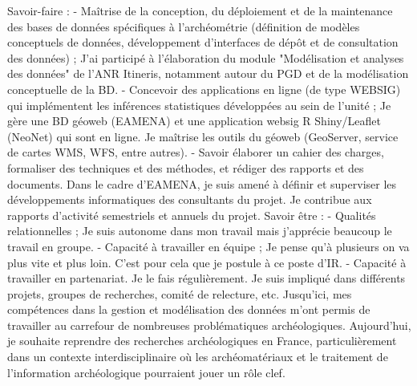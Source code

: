 Savoir-faire :
- Maîtrise de la conception, du déploiement et de la maintenance des bases de données spécifiques à
l'archéométrie (définition de modèles conceptuels de données, développement d'interfaces de dépôt et de
consultation des données) ;
J'ai participé à l'élaboration du module "Modélisation et analyses des données" de l'ANR Itineris, notamment autour du
PGD et de la modélisation conceptuelle de la BD.
- Concevoir des applications en ligne (de type WEBSIG) qui implémentent les inférences statistiques développées au
sein de l'unité ;
Je gère une BD géoweb (EAMENA) et une application websig R Shiny/Leaflet (NeoNet) qui sont en ligne. Je maîtrise les
outils du géoweb (GeoServer, service de cartes WMS, WFS, entre autres).
- Savoir élaborer un cahier des charges, formaliser des techniques et des méthodes, et rédiger des rapports et des
documents.
Dans le cadre d'EAMENA, je suis amené à définir et superviser les développements informatiques des consultants du
projet. Je contribue aux rapports d'activité semestriels et annuels du projet.
Savoir être :
- Qualités relationnelles ;
Je suis autonome dans mon travail mais j'apprécie beaucoup le travail en groupe.
- Capacité à travailler en équipe ;
Je pense qu'à plusieurs on va plus vite et plus loin. C'est pour cela que je postule à ce poste d'IR.
- Capacité à travailler en partenariat.
Je le fais régulièrement. Je suis impliqué dans différents projets, groupes de recherches, comité de relecture, etc.
Jusqu'ici, mes compétences dans la gestion et modélisation des données m'ont permis de travailler au carrefour de
nombreuses problématiques archéologiques. Aujourd'hui, je souhaite reprendre des recherches archéologiques en
France, particulièrement dans un contexte interdisciplinaire où les archéomatériaux et le traitement de l'information
archéologique pourraient jouer un rôle clef.

